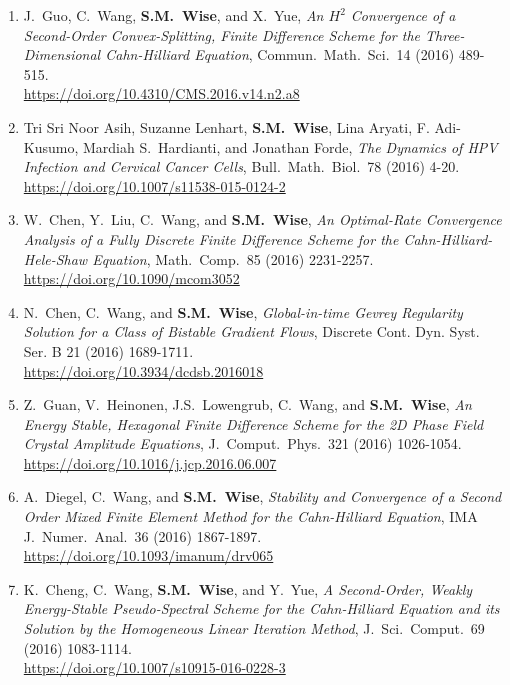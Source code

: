 \documentclass[11pt]{letter}
\begin{document}
\begin{enumerate}
	\item
J.~Guo, C.~Wang, \textbf{S.M.~Wise}, and X.~Yue, {\sl An $H^2$ Convergence of a Second-Order Convex-Splitting, Finite Difference Scheme for the Three-Dimensional Cahn-Hilliard Equation}, Commun.~Math.~Sci.~14 (2016) 489-515.
	\\ 
\url{https://doi.org/10.4310/CMS.2016.v14.n2.a8}

	\item
Tri Sri Noor Asih, Suzanne Lenhart, \textbf{S.M.~Wise}, Lina Aryati, F. Adi-Kusumo, Mardiah S.~Hardianti, and Jonathan Forde, {\sl The Dynamics of HPV Infection and Cervical Cancer Cells}, Bull.~Math.~Biol.~78 (2016) 4-20.
	\\ 
\url{https://doi.org/10.1007/s11538-015-0124-2}

	\item
W.~Chen, Y.~Liu, C.~Wang, and \textbf{S.M.~Wise}, {\sl An Optimal-Rate Convergence Analysis of a Fully Discrete Finite Difference Scheme for the Cahn-Hilliard-Hele-Shaw Equation}, Math.~Comp.~85 (2016) 2231-2257.
	\\ 
\url{https://doi.org/10.1090/mcom3052}

	\item
N.~Chen, C.~Wang, and \textbf{S.M.~Wise}, {\sl Global-in-time Gevrey Regularity Solution for a Class of Bistable Gradient Flows}, Discrete Cont. Dyn. Syst. Ser. B 21 (2016) 1689-1711.
	\\ 
\url{https://doi.org/10.3934/dcdsb.2016018}

	\item
Z.~Guan, V.~Heinonen, J.S.~Lowengrub, C.~Wang, and \textbf{S.M.~Wise}, {\sl An Energy Stable, Hexagonal Finite Difference Scheme for the 2D Phase Field Crystal Amplitude Equations}, J.~Comput.~Phys.~321 (2016) 1026-1054.
	\\ 
\url{https://doi.org/10.1016/j.jcp.2016.06.007}

	\item
A.~Diegel, C.~Wang, and \textbf{S.M.~Wise}, {\sl Stability and Convergence of a Second Order Mixed Finite Element Method for the Cahn-Hilliard Equation}, IMA J.~Numer.~Anal.~36 (2016) 1867-1897.
	\\ 
\url{https://doi.org/10.1093/imanum/drv065}

	\item
K.~Cheng, C.~Wang, \textbf{S.M.~Wise}, and Y.~Yue, {\sl A Second-Order, Weakly Energy-Stable Pseudo-Spectral Scheme for the Cahn-Hilliard Equation and its Solution by the Homogeneous Linear Iteration Method}, J.~Sci.~Comput.~69 (2016) 1083-1114.
	\\ 
\url{https://doi.org/10.1007/s10915-016-0228-3}


\end{enumerate}
\end{document}
